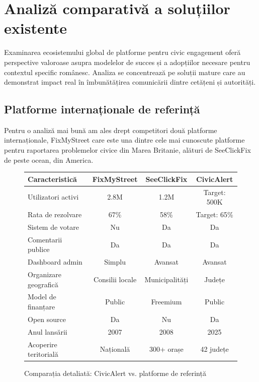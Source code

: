 \documentclass[12pt,a4paper]{report}
\begin{document}
\section{Analiză comparativă a soluțiilor existente}


Examinarea ecosistemului global de platforme pentru civic engagement oferă perspective valoroase asupra modelelor de succes și a adopțiilor necesare pentru contextul specific românesc. Analiza se concentrează pe soluții mature care au demonstrat impact real în îmbunătățirea comunicării dintre cetățeni și autorități.

\subsection{Platforme internaționale de referință}

Pentru o analiză mai bună am ales drept competitori două platforme internaționale, FixMyStreet care este una dintre cele mai cunoscute platforme pentru raportarea problemelor civice din Marea Britanie, alături de SeeClickFix de peste ocean, din America.

\begin{figure}[H]
\centering
\begin{tabular}{|l|c|c|c|}
\hline
\textbf{Caracteristică} & \textbf{FixMyStreet} & \textbf{SeeClickFix} & \textbf{CivicAlert} \\
\hline
Utilizatori activi & 2.8M & 1.2M & Target: 500K \\
\hline
Rata de rezolvare & 67\% & 58\% & Target: 65\% \\
\hline
Sistem de votare & Nu & Da & Da \\
\hline
Comentarii publice & Da & Da & Da \\
\hline
Dashboard admin & Simplu & Avansat & Avansat \\
\hline
Organizare geografică & Consilii locale & Municipalități & Județe \\
\hline
Model de finanțare & Public & Freemium & Public \\
\hline
Open source & Da & Nu & Da \\
\hline
Anul lansării & 2007 & 2008 & 2025 \\
\hline
Acoperire teritorială & Națională & 300+ orașe & 42 județe \\
\hline
\end{tabular}
\caption{Comparația detaliată: CivicAlert vs. platforme de referință}
\label{tab:comparatie_detaliata}
\end{figure}
\end{document}
